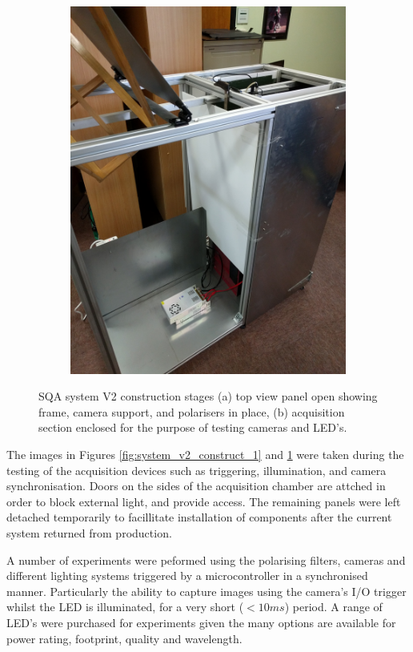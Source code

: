 \documentclass[fleqn,twoside,12pt]{report}
\begin{document}
\begin{figure}[h]
\begin{subfigure}{.5\textwidth}
		\includegraphics[width=0.9\linewidth]{system_v2_construct_2.jpg}
		\caption{}
		\label{fig:system_v2_construct_2}
	\end{subfigure}%
	\caption{SQA system V2 construction stages (a) top view panel open showing frame, camera support, and polarisers in place, (b) acquisition section enclosed for the purpose of testing cameras and LED's.}
	\label{}
\end{figure}

The images in Figures \ref{fig:system_v2_construct_1} and \ref{fig:system_v2_construct_2} were taken during the testing of the acquisition devices such as triggering, illumination, and camera synchronisation. Doors on the sides of the acquisition chamber are attched in order to block external light, and provide access. The remaining panels were left detached temporarily to facillitate installation of components after the current system returned from production. 

A number of experiments were peformed using the polarising filters, cameras and different lighting systems triggered by a microcontroller in a synchronised manner. Particularly the ability to capture images using the camera's I/O trigger whilst the LED is illuminated, for a very short ($<10ms$) period. A range of LED's were purchased for experiments given the many options are available for power rating, footprint, quality and wavelength.
\end{document}
